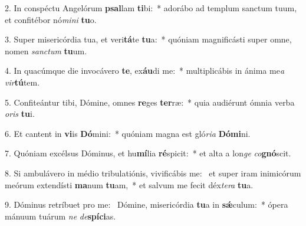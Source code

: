 2. In conspéctu Angelórum \textbf{psal}lam \textbf{ti}bi:~*  adorábo ad templum sanctum tuum, et confitébor nó\textit{mi}\textit{ni} \textbf{tu}o.\

3. Super misericórdia tua, et veri\textbf{tá}te \textbf{tu}a:~*  quóniam magnificásti super omne, nomen \textit{sanc}\textit{tum} \textbf{tu}um.\

4. In quacúmque die invocávero \textbf{te}, ex\textbf{áu}di me:~*  multiplicábis in ánima me\textit{a} \textit{vir}\textbf{tú}tem.\

5. Confiteántur tibi, Dómine, omnes \textbf{re}ges \textbf{ter}ræ:~*  quia audiérunt ómnia verba \textit{o}\textit{ris} \textbf{tu}i.\

6. Et cantent in \textbf{vi}is \textbf{Dó}mini:~*  quóniam magna est gló\textit{ri}\textit{a} \textbf{Dó}\textbf{mi}ni.\

7. Quóniam excélsus Dóminus, et hu\textbf{mí}lia \textbf{ré}spicit:~*  et alta a lon\textit{ge} \textit{co}\textbf{gnó}scit.\

8. Si ambulávero in médio tribulatiónis, vivificábis me: \dag\  et super iram inimicórum meórum extendísti \textbf{ma}num \textbf{tu}am,~*  et salvum me fecit déx\textit{te}\textit{ra} \textbf{tu}a.\

9. Dóminus retríbuet pro me: \dag\  Dómine, misericórdia \textbf{tu}a in \textbf{sǽ}culum:~*  ópera mánuum tuárum \textit{ne} \textit{de}\textbf{spí}\textbf{ci}as.\


